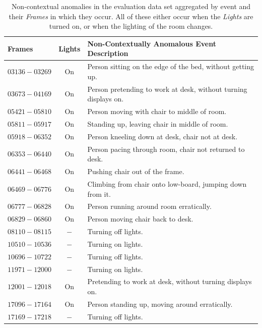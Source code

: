 \begin{table}
	\centering
	\begin{tabular}{ | l | c | p{11cm} |}
	\toprule
	\textbf{Frames} & \textbf{Lights} & \textbf{Non-Contextually Anomalous Event Description} \\
	\midrule
	$03136 - 03269$ & On & Person sitting on the edge of the bed, without getting up. \\
	$03673 - 04169$ & On & Person pretending to work at desk, without turning displays on. \\
	$05421 - 05810$ & On & Person moving with chair to middle of room. \\
	$05811 - 05917$ & On & Standing up, leaving chair in middle of room. \\
	$05918 - 06352$ & On & Person kneeling down at desk, chair not at desk. \\
	$06353 - 06440$ & On & Person pacing through room, chair not returned to desk.  \\
	$06441 - 06468$ & On & Pushing chair out of the frame. \\
	$06469 - 06776$ & On & Climbing from chair onto low-board, jumping down from it. \\
	$06777 - 06828$ & On & Person running around room erratically. \\
	$06829 - 06860$ & On & Person moving chair back to desk. \\
	$08110 - 08115$ & $-$ & Turning off lights. \\
	$10510 - 10536$ & $-$ & Turning on lights. \\
	$10696 - 10722$ & $-$ & Turning off lights. \\
	$11971 - 12000$ & $-$ & Turning on lights. \\
	$12001 - 12018$ & On & Pretending to work at desk, without turning displays on. \\
	$17096 - 17164$ & On & Person standing up, moving around erratically. \\
	$17169 - 17218$ & $-$ & Turning off lights. \\
	\bottomrule
	\end{tabular}
	\caption[Non-contextual anomalies in the evaluation data set.]{Non-contextual anomalies in the evaluation data set aggregated by event and their \textit{Frames} in which they occur. All of these either occur when the \textit{Lights} are turned on, or when the lighting of the room changes.}
	\label{tab:dataset_nc_anomaly}
\end{table}


